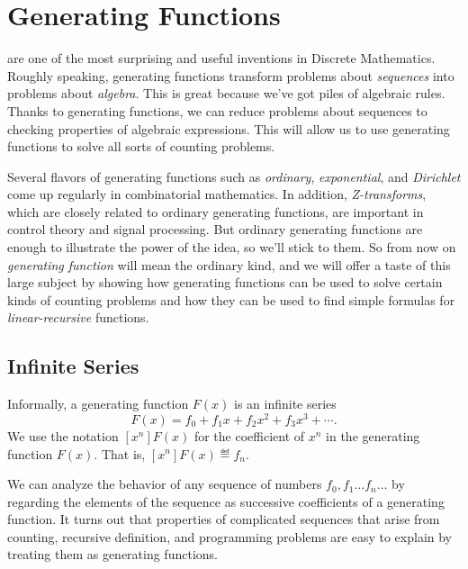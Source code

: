 \chapter{Generating Functions}\label{generating_function_chap}

 are one of the most surprising and useful
inventions in Discrete Mathematics.  Roughly speaking, generating
functions transform problems about \textit{sequences} into problems
about \textit{algebra}.  This is great because we've got piles of
algebraic rules.  Thanks to generating functions, we can reduce
problems about sequences to checking properties of algebraic
expressions.  This will allow us to use generating functions to
solve all sorts of counting problems.

Several flavors of generating functions such as \emph{ordinary},
\emph{exponential}, and \emph{Dirichlet} come up regularly in
combinatorial mathematics.  In addition, \emph{Z-transforms}, which
are closely related to ordinary generating functions, are important in
control theory and signal processing.  But ordinary generating
functions are enough to illustrate the power of the idea, so we'll
stick to them.  So from now on \emph{generating function} will mean
the ordinary kind, and we will offer a taste of this large subject by
showing how generating functions can be used to solve certain kinds of
counting problems and how they can be used to find simple formulas for
\emph{linear-recursive} functions.

\section{Infinite Series}
Informally, a generating function $F(x)$ is an infinite series
\begin{equation}\label{def:Fxf_0}
F(x) = f_0 + f_1 x + f_2 x^2 + f_3 x^3 + \cdots.
\end{equation}
We use the notation $[x^n]F(x)$ for the coefficient of $x^n$ in the
generating function $F(x)$.  That is, $[x^n]F(x) \eqdef f_n$.

We can analyze the behavior of any sequence of numbers $f_0, f_1 \dots
f_n \dots$ by regarding the elements of the sequence as successive
coefficients of a generating function.  It turns out that properties
of complicated sequences that arise from counting, recursive
definition, and programming problems are easy to explain by treating
them as generating functions.

